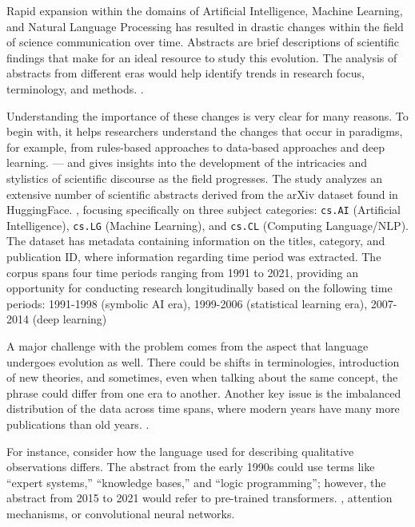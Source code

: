 \documentclass{article}
\begin{document}
Rapid expansion within the domains of Artificial Intelligence,
Machine Learning, and Natural Language Processing has
resulted in drastic changes within the field of science
communication over time. Abstracts are brief descriptions of
scientific findings that make for an ideal resource to study
this evolution. The analysis of abstracts from different eras
would help identify trends in research focus, terminology,
and methods.
\citep{arxiv2020}.

Understanding the importance of these changes is very clear for many reasons. To begin with, it helps researchers understand the changes that occur in paradigms, for example, from rules-based approaches to data-based approaches and deep learning.
\citep{devlin-etal-2019-bert} — and gives insights into the development of the intricacies and stylistics of scientific discourse as the field progresses.
The study analyzes an extensive number of scientific abstracts derived from the arXiv dataset found in HuggingFace.
\citep{arxiv2020}, focusing specifically on three subject
categories: \texttt{cs.AI} (Artificial Intelligence),
\texttt{cs.LG} (Machine Learning), and \texttt{cs.CL}
(Computing  Language/NLP). The dataset has metadata containing information on the
titles, category, and publication ID, where information
regarding time period was extracted. The corpus spans four
time periods ranging from 1991 to 2021, providing an opportunity
for conducting research longitudinally based on the following
time periods: 1991-1998 (symbolic AI era), 1999-2006
(statistical learning era), 2007-2014 (deep learning)

A major challenge with the problem comes from the aspect
that language undergoes evolution as well. There could
be shifts in terminologies, introduction of new theories,
and sometimes, even when talking about the same
concept, the phrase could differ from one era to another.
Another key issue is the imbalanced distribution
of the data across time spans, where modern years have
many more publications than old years.
\citep{scikit-learn, nltk}.

For instance, consider how the language used for describing qualitative observations differs.
The abstract from the early 1990s could use terms like “expert systems,” “knowledge bases,” and “logic programming”; however, the abstract from 2015 to 2021 would refer to pre-trained transformers.
\citep{devlin-etal-2019-bert}, attention mechanisms,
or convolutional neural networks.
\end{document}
